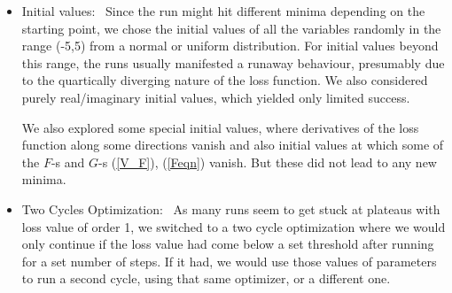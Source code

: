\documentclass[12pt,a4paper]{JHEP3}
\newcommand{\refb}[1]{(\ref{#1})}
\begin{document}
\begin{itemize}
%

\item
Initial values: \,
Since the run might hit different  minima depending on the starting point, we chose the initial values of all the variables randomly in the range (-5,5) from a normal or uniform distribution. For initial values beyond this range, the runs usually manifested a runaway behaviour, presumably due to the quartically diverging nature of the loss function. We also considered purely real/imaginary initial values, which yielded only limited success. 

We also explored some special initial values, where derivatives of the loss function along some directions vanish and also initial values at which some of the 
$F$-s and $G$-s  \refb{V_F}, \refb{Feqn} vanish. But  these did not lead to any new minima.


\item
Two Cycles Optimization: \,
As many runs seem  to get stuck at plateaus with
 loss value of order 1, we switched to a two cycle optimization where we would only continue if the loss value had come below a set threshold after running for a set number of steps. If it had, we would use those values of parameters to run a second cycle, using that same optimizer, or a different one. 


\end{itemize}
\end{document}
